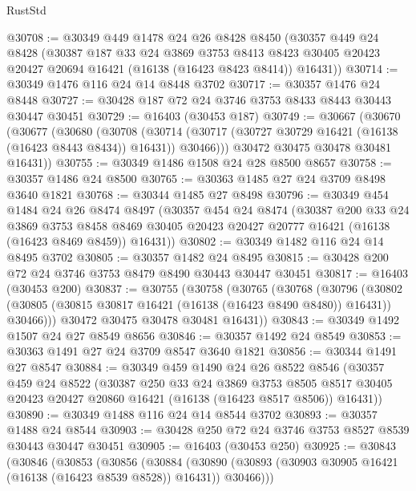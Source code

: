 \begin{lexlean}{RustStd}
\begin{coremodule}
@30708 := @30349
    @449
    @1478
    @24
    @26
    @8428
    @8450
    (@30357
      @449
      @24
      @8428
      (@30387
        @187
        @33
        @24
        @3869
        @3753
        @8413
        @8423
        @30405
        @20423
        @20427
        @20694
        @16421
        (@16138 (@16423 @8423 @8414))
        @16431))
@30714 := @30349 @1476 @116 @24 @14 @8448 @3702
@30717 := @30357 @1476 @24 @8448
@30727 := @30428 @187 @72 @24 @3746 @3753 @8433 @8443 @30443 @30447 @30451
@30729 := @16403 (@30453 @187)
@30749 := @30667
    (@30670
      (@30677
        (@30680
          (@30708
            (@30714 (@30717 (@30727 @30729 @16421 (@16138 (@16423 @8443 @8434)) @16431)) @30466)))
        @30472
        @30475
        @30478
        @30481
        @16431))
@30755 := @30349 @1486 @1508 @24 @28 @8500 @8657
@30758 := @30357 @1486 @24 @8500
@30765 := @30363 @1485 @27 @24 @3709 @8498 @3640 @1821
@30768 := @30344 @1485 @27 @8498
@30796 := @30349
    @454
    @1484
    @24
    @26
    @8474
    @8497
    (@30357
      @454
      @24
      @8474
      (@30387
        @200
        @33
        @24
        @3869
        @3753
        @8458
        @8469
        @30405
        @20423
        @20427
        @20777
        @16421
        (@16138 (@16423 @8469 @8459))
        @16431))
@30802 := @30349 @1482 @116 @24 @14 @8495 @3702
@30805 := @30357 @1482 @24 @8495
@30815 := @30428 @200 @72 @24 @3746 @3753 @8479 @8490 @30443 @30447 @30451
@30817 := @16403 (@30453 @200)
@30837 := @30755
    (@30758
      (@30765
        (@30768
          (@30796
            (@30802 (@30805 (@30815 @30817 @16421 (@16138 (@16423 @8490 @8480)) @16431)) @30466)))
        @30472
        @30475
        @30478
        @30481
        @16431))
@30843 := @30349 @1492 @1507 @24 @27 @8549 @8656
@30846 := @30357 @1492 @24 @8549
@30853 := @30363 @1491 @27 @24 @3709 @8547 @3640 @1821
@30856 := @30344 @1491 @27 @8547
@30884 := @30349
    @459
    @1490
    @24
    @26
    @8522
    @8546
    (@30357
      @459
      @24
      @8522
      (@30387
        @250
        @33
        @24
        @3869
        @3753
        @8505
        @8517
        @30405
        @20423
        @20427
        @20860
        @16421
        (@16138 (@16423 @8517 @8506))
        @16431))
@30890 := @30349 @1488 @116 @24 @14 @8544 @3702
@30893 := @30357 @1488 @24 @8544
@30903 := @30428 @250 @72 @24 @3746 @3753 @8527 @8539 @30443 @30447 @30451
@30905 := @16403 (@30453 @250)
@30925 := @30843
    (@30846
      (@30853
        (@30856
          (@30884
            (@30890 (@30893 (@30903 @30905 @16421 (@16138 (@16423 @8539 @8528)) @16431)) @30466)))

\end{coremodule}
\end{lexlean}

